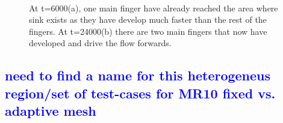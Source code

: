 \documentclass[preprint,authoryear,12pt]{elsarticle}
\newcommand{\blue}{\textcolor{blue}}
\begin{document}
\begin{figure}
\centering
{}\\[2mm]%
%
\caption{At t=6000(a), one main finger have already reached the area where sink exists as they have develop much faster than the rest of the fingers. At t=24000(b) there are two main fingers that now have developed and drive the flow forwards.}
\label{fig:3c_heteheleshaw_10}
\end{figure}


\subsection{\blue{need to find a name for this heterogeneus region/set of test-cases for MR10 fixed vs. adaptive mesh}}
\end{document}
